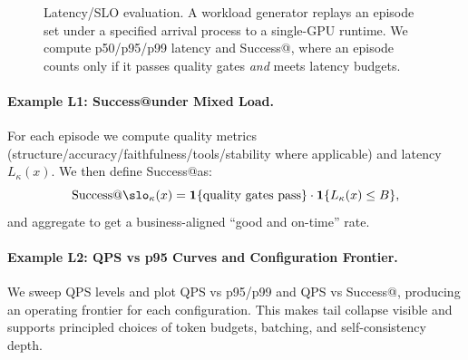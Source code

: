 \begin{figure}[t]
\centering
{}
\caption{Latency/SLO evaluation.
A workload generator replays an episode set under a specified arrival process to a single-GPU runtime.
We compute p50/p95/p99 latency and Success@\slo, where an episode counts only if it passes quality gates \emph{and} meets latency budgets.}
\label{fig:slo-eval}
\end{figure}

\paragraph{Example L1: Success@\slo under Mixed Load.}
For each episode we compute quality metrics (structure/accuracy/faithfulness/tools/stability where applicable) and latency $L_\kappa(x)$.
We then define Success@\slo as:
\[
\text{Success@\slo}_\kappa(x)=
\mathbf{1}\{\text{quality gates pass}\}\cdot \mathbf{1}\{L_\kappa(x)\le B\},
\]
and aggregate to get a business-aligned “good and on-time” rate.

\paragraph{Example L2: QPS vs p95 Curves and Configuration Frontier.}
We sweep QPS levels and plot QPS vs p95/p99 and QPS vs Success@\slo, producing an operating frontier for each configuration.
This makes tail collapse visible and supports principled choices of token budgets, batching, and self-consistency depth.


